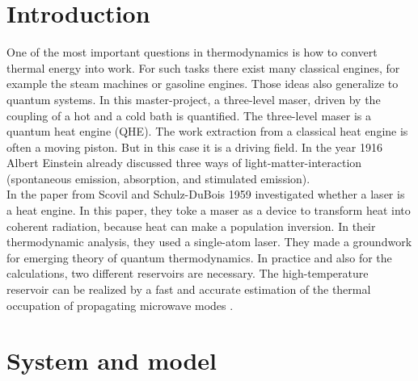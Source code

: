 \documentclass[12pt,a4paper]{article}
\begin{document}
\section{Introduction}
One of the most important questions in thermodynamics is how to convert
thermal energy into work. For such tasks there exist many classical engines, for
example the steam machines or gasoline engines. %
Those ideas also generalize to quantum systems.
In this master-project, a three-level maser, driven by the coupling of a hot and a cold bath is quantified.
The three-level maser is a quantum heat engine (QHE). The work extraction from a classical heat engine is often a moving piston. But in this case
it is a driving field. In the year 1916 Albert Einstein already discussed three ways of
light-matter-interaction (spontaneous emission, absorption, and stimulated
emission)\cite{Li2017}. \\In the paper from  Scovil and Schulz-DuBois 1959 \cite{Scovil1959} investigated whether a laser is a heat engine. In this paper, they toke a maser as a device to transform heat into coherent radiation, because heat can make a population inversion.
In their thermodynamic analysis, they used a single-atom laser. They made a
groundwork for emerging theory of quantum thermodynamics. In practice and also for the calculations, two different reservoirs are necessary. The high-temperature reservoir can be
realized by a fast and accurate
estimation of the thermal occupation of propagating microwave modes  \cite{Scigliuzzo2020}.
\newpage
\section{System and model}
\end{document}
